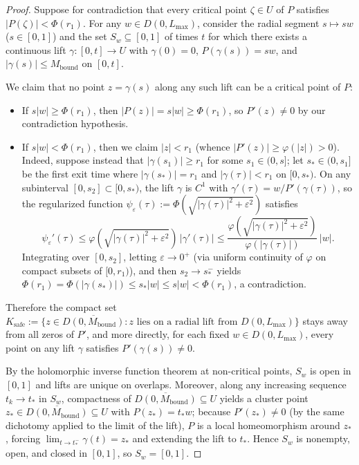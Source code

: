 \documentclass[11pt,a4paper]{article}
\theoremstyle{definition}
\theoremstyle{remark}
\begin{document}
\begin{proof}
Suppose for contradiction that every critical point $\zeta \in U$ of $P$ satisfies $|P(\zeta)| < \Phi(r_1)$.
For any $w \in D(0, L_{\max})$, consider the radial segment $s \mapsto s w$ ($s \in [0, 1]$) and the set $S_w \subseteq [0, 1]$ of times $t$ for which there exists a continuous lift $\gamma : [0, t] \to U$ with $\gamma(0) = 0$, $P(\gamma(s)) = s w$, and $|\gamma(s)| \le M_{\mathrm{bound}}$ on $[0, t]$.

We claim that no point $z = \gamma(s)$ along any such lift can be a critical point of $P$:
\begin{itemize}
\item If $s |w| \ge \Phi(r_1)$, then $|P(z)| = s |w| \ge \Phi(r_1)$, so $P'(z) \neq 0$ by our contradiction hypothesis.
\item If $s |w| < \Phi(r_1)$, then we claim $|z| < r_1$ (whence $|P'(z)| \ge \varphi(|z|) > 0$). Indeed, suppose instead that $|\gamma(s_1)| \ge r_1$ for some $s_1 \in (0, s]$; let $s_* \in (0, s_1]$ be the first exit time where $|\gamma(s_*)| = r_1$ and $|\gamma(\tau)| < r_1$ on $[0, s_*)$. On any subinterval $[0, s_2] \subset [0, s_*)$, the lift $\gamma$ is $C^1$ with $\gamma'(\tau) = w / P'(\gamma(\tau))$, so the regularized function $\psi_\varepsilon(\tau) := \Phi(\sqrt{|\gamma(\tau)|^2 + \varepsilon^2})$ satisfies
\[
\psi_\varepsilon'(\tau) \le \varphi(\sqrt{|\gamma(\tau)|^2 + \varepsilon^2})\, |\gamma'(\tau)| \le \frac{\varphi(\sqrt{|\gamma(\tau)|^2 + \varepsilon^2})}{\varphi(|\gamma(\tau)|)}\, |w|.
\]
Integrating over $[0, s_2]$, letting $\varepsilon \to 0^+$ (via uniform continuity of $\varphi$ on compact subsets of $[0, r_1)$), and then $s_2 \to s_*^-$ yields $\Phi(r_1) = \Phi(|\gamma(s_*)|) \le s_* |w| \le s |w| < \Phi(r_1)$, a contradiction.
\end{itemize}
Therefore the compact set $K_{\mathrm{safe}} := \{z \in \overline{D(0, M_{\mathrm{bound}})} : \text{$z$ lies on a radial lift from } D(0, L_{\max})\}$ stays away from all zeros of $P'$, and more directly, for each fixed $w \in D(0, L_{\max})$, every point on any lift $\gamma$ satisfies $P'(\gamma(s)) \neq 0$.

By the holomorphic inverse function theorem at non-critical points, $S_w$ is open in $[0, 1]$ and lifts are unique on overlaps. Moreover, along any increasing sequence $t_k \to t_*$ in $S_w$, compactness of $\overline{D(0, M_{\mathrm{bound}})} \subseteq U$ yields a cluster point $z_* \in \overline{D(0, M_{\mathrm{bound}})} \subseteq U$ with $P(z_*) = t_* w$; because $P'(z_*) \neq 0$ (by the same dichotomy applied to the limit of the lift), $P$ is a local homeomorphism around $z_*$, forcing $\lim_{t \to t_*^-} \gamma(t) = z_*$ and extending the lift to $t_*$. Hence $S_w$ is nonempty, open, and closed in $[0, 1]$, so $S_w = [0, 1]$.


\end{proof}
\end{document}
